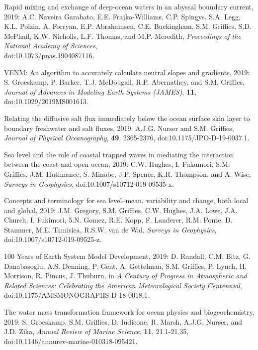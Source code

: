 \begin{etaremune}
\item Rapid mixing and exchange of deep-ocean waters in an abyssal boundary current, 2019: A.C. Naveira Garabato, E.E. Frajka-Williams, C.P. Spingys, S.A. Legg, K.L. Polzin, A. Forryan, E.P. Abrahamsen, C.E. Buckingham, S.M. Grif\/f\/ies, S.D. McPhail, K.W. Nicholls, L.F. Thomas, and M.P. Meredith,  {\it Proceedings of the National Academy of Sciences}, \\ doi:10.1073/pnas.1904087116.

\item VENM: An algorithm to accurately calculate neutral slopes and gradients, 2019: S. Groeskamp, P. Barker, T.J. McDougall, R.P. Abernathey, and S.M. Grif\/f\/ies, {\it Journal of Advances in Modeling Earth Systems (JAMES)}, {\bf 11}, doi:10.1029/2019MS001613.

\item Relating the diffusive salt flux immediately below the ocean surface skin layer to boundary freshwater and salt fluxes, 2019: A.J.G. Nurser and S.M. Grif\/f\/ies, {\it Journal of Physical Oceanography}, {\bf 49}, 2365-2376, doi:10.1175/JPO-D-19-0037.1.

\item Sea level and the role of coastal trapped waves in mediating the interaction between the coast and open ocean, 2019: C.W. Hughes, I. Fukumori, S.M. Grif\/f\/ies, J.M. Huthnance, S. Minobe, J.P. Spence, K.R. Thompson, and A. Wise, {\it Surveys in Geophysics},
doi:10.1007/s10712-019-09535-x.

\item Concepts and terminology for sea level--mean, variability and change, both local and global, 2019: J.M. Gregory, S.M. Grif\/f\/ies, C.W. Hughes, J.A. Lowe, J.A. Church, I. Fukimori, 5.N. Gomez, R.E. Kopp, F. Landerer, R.M. Ponte, D. Stammer, M.E. Tamisiea, R.S.W. van de Wal, {\it Surveys in Geophysics},
doi:10.1007/s10712-019-09525-z.

\item 100 Years of Earth System Model Development, 2019: D. Randall, C.M. Bitz, G. Danabasoglu, A.S. Denning, P. Gent, A. Gettelman, S.M. Grif\/f\/ies, P. Lynch, H. Morrison, R. Pincus, J. Thuburn, in {\it A Century of Progress in Atmospheric and Related Sciences: Celebrating the American Meteorological Society Centennial}, doi:10.1175/AMSMONOGRAPHS-D-18-0018.1.

\item The water mass transformation framework for ocean physics and biogeochemistry, 2019: S. Groeskamp, S.M. Grif\/f\/ies, D. Iudicone,  R. Marsh, A.J.G. Nurser, and J.D. Zika, {\it Annual Review of Marine Science}, {\bf 11}, 21.1-21.35, doi:10.1146/annurev-marine-010318-095421.


\end{etaremune}
